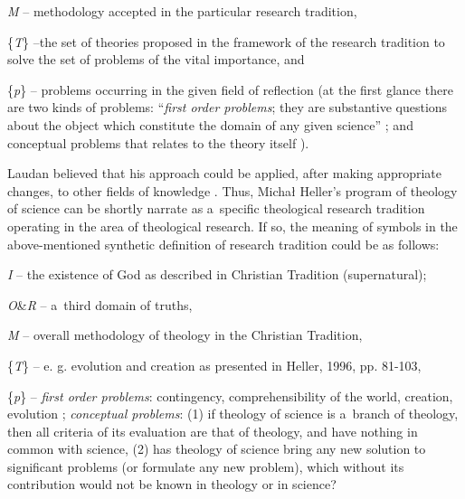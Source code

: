 \textit{M} -- methodology accepted in the particular research tradition,



\{\textit{T}\} –the set of theories proposed in the framework of the research tradition to solve the set of problems of the vital importance, and



\{\textit{p}\} -- problems occurring in the given field of reflection (at the first glance there are two kinds of problems: ``\textit{first order problems}; they are substantive questions about the object which constitute the domain of any given science'' 
\parencites[][p.15]{laudan_progress_1977}[][]{}; %
 and conceptual problems that relates to the theory itself 
\parencite[][chap.2]{laudan_progress_1977}%
).



Laudan believed that his approach could be applied, after making appropriate changes, to other fields of knowledge 
\parencite[][pp.189–192]{laudan_progress_1977}. %
 Thus, Michał Heller's program of theology of science can be shortly narrate as a~specific theological research tradition operating in the area of theological research. If so, the meaning of symbols in the above-mentioned synthetic definition of research tradition could be as follows:



\textit{I} -- the existence of God as described in Christian Tradition (supernatural);



\textit{O}\&\textit{R} -- a~third domain of truths,



\textit{M} -- overall methodology of theology in the Christian Tradition,



\{\textit{T}\} -- e. g. evolution and creation as presented in Heller, 1996, pp. 81-103,



\{\textit{p}\} -- \textit{first order problems}: contingency, comprehensibility of the world, creation, evolution 
\parencite[for a~more detailed compilatiosee:][pp.67–137]{macek_teologia_2014}; %
 \textit{conceptual problems}: (1) if theology of science is a~branch of theology, then all criteria of its evaluation are that of theology, and have nothing in common with science, (2) has theology of science bring any new solution to significant problems (or formulate any new problem), which without its contribution would not be known in theology or in science?



